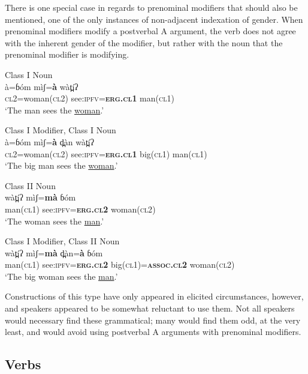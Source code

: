 \documentclass[output=collectionpaper,hidelinks]{langscibook}
\theoremstyle{remark}
\begin{document}
There is one special case in regards to prenominal modifiers that should also be mentioned, one of the only instances of non-adjacent indexation of gender. When
prenominal modifiers modify a postverbal A argument, the verb does not agree
with the inherent gender of the modifier, but rather with the noun that the
prenominal modifier is modifying.

\ea
 Class I Noun \\
\gll à=ɓóm mìʃ=\textbf{à} wàt̪íʔ \\
 \textsc{cl2}=woman(\textsc{cl2}) see:\textsc{ipfv}=\textbf{\textsc{erg.cl1}} man(\textsc{cl1}) \\
\glt `The man sees the \uline{woman}.' \\
\z

\ea
 Class I Modifier, Class I Noun \\
\gll à=ɓóm mìʃ=\textbf{à} d̪àn wàt̪íʔ \\
 \textsc{cl2}=woman(\textsc{cl2}) see:\textsc{ipfv}=\textbf{\textsc{erg.cl1}} big(\textsc{cl1}) man(\textsc{cl1}) \\
\glt `The big man sees the \uline{woman}.' \\
\z

\ea
 Class II Noun \\
\gll wàt̪íʔ mìʃ=\textbf{mà} ɓóm \\
 man(\textsc{cl1}) see:\textsc{ipfv}=\textbf{\textsc{erg.cl2}} woman(\textsc{cl2}) \\
\glt `The woman sees the \uline{man}.' \\
\z

\ea
 Class I Modifier, Class II Noun \\
\gll wàt̪íʔ mìʃ=\textbf{mà} d̪àn=\textbf{à} ɓóm \\
 man(\textsc{cl1}) see:\textsc{ipfv}=\textbf{\textsc{erg.cl2}} big(\textsc{cl1})=\textbf{\textsc{assoc.cl2}} woman(\textsc{cl2}) \\
\glt `The big woman sees the \uline{man}.' \\
\z

Constructions of this type have only appeared in elicited circumstances,
however, and speakers appeared to be somewhat reluctant to use them.  Not all
 speakers would necessary find these grammatical; many would find them odd,
at the very least, and would avoid using postverbal A arguments with prenominal
modifiers.

\subsection{Verbs}
\label{sec:Don:Verbs}
\end{document}
